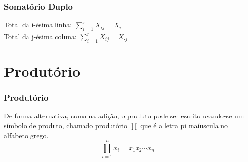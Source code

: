 \documentclass[12pt]{beamer}
\begin{document}
\begin{frame}{}
\frametitle{Somatório Duplo}
\begin{block}{}
\begin{center}
    Total da i-ésima linha: ${\displaystyle \sum_{j=1}^{s}}X_{ij}=X_{i\cdot}$\\
    Total da j-ésima coluna: ${\displaystyle \sum_{i=1}^{r}}X_{ij}=X_{\cdot j}$
\end{center}
\end{block}
\end{frame}

\section{Produtório}
\begin{frame}{}
\frametitle{Produtório}
\begin{block}{}
\justifying
De forma alternativa, como na adição, o produto pode ser escrito usando-se um símbolo de produto, chamado 
produtório $\prod$ que é a letra pi maíuscula no alfabeto grego.
$${\displaystyle \prod_{i=1}^{n}x_{i}=x_{1}x_{2}\cdots x_{n}}$$
\end{block}
\end{frame}

% 
\end{document}

